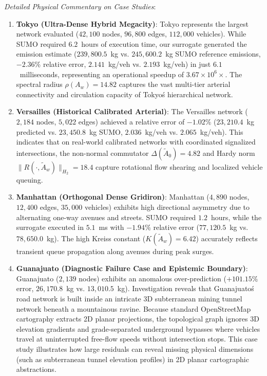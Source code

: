 \documentclass[journal]{IEEEtran}
\begin{document}
\textit{Detailed Physical Commentary on Case Studies}:
\begin{enumerate}
    \item \textbf{Tokyo (Ultra-Dense Hybrid Megacity)}: Tokyo represents the largest network evaluated ($42,100$ nodes, $96,800$ edges, $112,000$ vehicles). While SUMO required $6.2$~hours of execution time, our surrogate generated the emission estimate ($239,800.5$~kg vs. $245,600.2$~kg SUMO reference emissions, $-2.36\%$ relative error, $2.141$~kg/veh vs. $2.193$~kg/veh) in just $6.1$~milliseconds, representing an operational speedup of $3.67 \times 10^6 \times$. The spectral radius $\rho(A_w) = 14.82$ captures the vast multi-tier arterial connectivity and circulation capacity of Tokyo\'s hierarchical network.
    
    \item \textbf{Versailles (Historical Calibrated Arterial)}: The Versailles network ($2,184$ nodes, $5,022$ edges) achieved a relative error of $-1.02\%$ ($23,210.4$~kg predicted vs. $23,450.8$~kg SUMO, $2.036$~kg/veh vs. $2.065$~kg/veh). This indicates that on real-world calibrated networks with coordinated signalized intersections, the non-normal commutator $\Delta(\tilde{A}_0) = 4.82$ and Hardy norm $\|R(\cdot, \tilde{A}_w)\|_{H_2} = 18.4$ capture rotational flow shearing and localized vehicle queuing.
    
    \item \textbf{Manhattan (Orthogonal Dense Gridiron)}: Manhattan ($4,890$ nodes, $12,400$ edges, $35,000$ vehicles) exhibits high directional asymmetry due to alternating one-way avenues and streets. SUMO required $1.2$~hours, while the surrogate executed in $5.1$~ms with $-1.94\%$ relative error ($77,120.5$~kg vs. $78,650.0$~kg). The high Kreiss constant ($K(\tilde{A}_w) = 6.42$) accurately reflects transient queue propagation along avenues during peak surges.
    
    \item \textbf{Guanajuato (Diagnostic Failure Case and Epistemic Boundary)}: Guanajuato ($2,139$ nodes) exhibits an anomalous over-prediction ($+101.15\%$ error, $26,170.8$~kg vs. $13,010.5$~kg). Investigation reveals that Guanajuato\'s road network is built inside an intricate 3D subterranean mining tunnel network beneath a mountainous ravine. Because standard OpenStreetMap cartography extracts 2D planar projections, the topological graph ignores 3D elevation gradients and grade-separated underground bypasses where vehicles travel at uninterrupted free-flow speeds without intersection stops. This case study illustrates how large residuals can reveal missing physical dimensions (such as subterranean tunnel elevation profiles) in 2D planar cartographic abstractions.
\end{enumerate}
\end{document}
